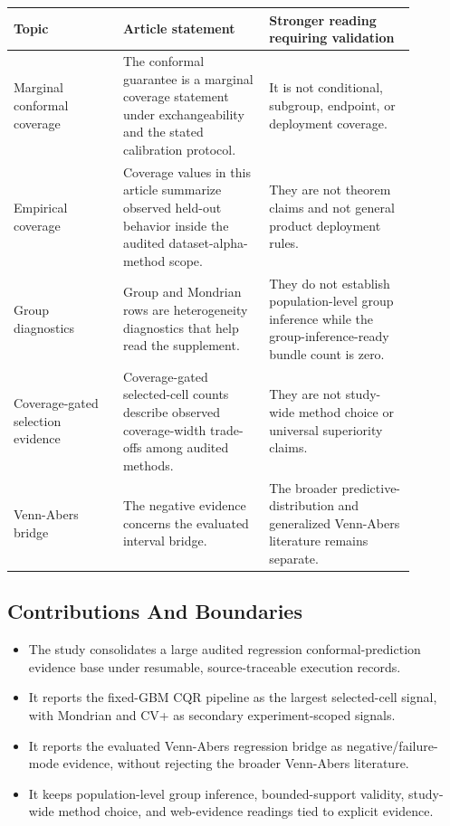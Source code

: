 \documentclass[11pt]{article}
\begin{document}
\begingroup
\footnotesize
\setlength{\tabcolsep}{2pt}
\renewcommand{\arraystretch}{1.18}
\begin{tabular}{@{}>{\RaggedRight\arraybackslash}p{0.240\linewidth}>{\RaggedRight\arraybackslash}p{0.320\linewidth}>{\RaggedRight\arraybackslash}p{0.320\linewidth}@{}}
\toprule
Topic & Article statement & Stronger reading requiring validation \\
\midrule
Marginal conformal coverage & The conformal guarantee is a marginal coverage statement under exchangeability and the stated calibration protocol. & It is not conditional, subgroup, endpoint, or deployment coverage. \\
Empirical coverage & Coverage values in this article summarize observed held-out behavior inside the audited dataset-alpha-method scope. & They are not theorem claims and not general product deployment rules. \\
Group diagnostics & Group and Mondrian rows are heterogeneity diagnostics that help read the supplement. & They do not establish population-level group inference while the group-inference-ready bundle count is zero. \\
Coverage-gated selection evidence & Coverage-gated selected-cell counts describe observed coverage-width trade-offs among audited methods. & They are not study-wide method choice or universal superiority claims. \\
Venn-Abers bridge & The negative evidence concerns the evaluated interval bridge. & The broader predictive-distribution and generalized Venn-Abers literature remains separate. \\
\bottomrule
\end{tabular}
\endgroup

\subsection{Contributions And Boundaries}

\begin{itemize}
\item The study consolidates a large audited regression conformal-prediction evidence base under resumable, source-traceable execution records.
\item It reports the fixed-GBM CQR pipeline as the largest selected-cell signal, with Mondrian and CV+ as secondary experiment-scoped signals.
\item It reports the evaluated Venn-Abers regression bridge as negative/failure-mode evidence, without rejecting the broader Venn-Abers literature.
\item It keeps population-level group inference, bounded-support validity, study-wide method choice, and web-evidence readings tied to explicit evidence.
\end{itemize}
\end{document}
